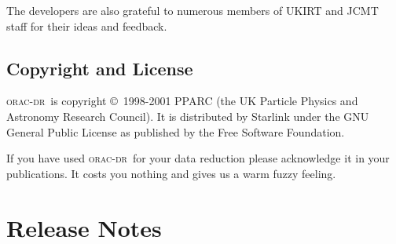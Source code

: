 \documentclass[twoside,11pt]{article}
\renewcommand{\_}{\texttt{\symbol{95}}}
\newcommand{\oracdr}{\textsc{orac-dr}}
\begin{document}
The developers are also grateful to numerous members of
UKIRT and JCMT staff for their ideas and feedback.

\subsection*{Copyright and License\label{ORAC-DR_Copyright_and_License}}

\oracdr\ is copyright \copyright\ 1998-2001 PPARC (the UK Particle Physics and Astronomy
Research Council). It is distributed by Starlink under the
GNU General Public License as published by the Free Software Foundation.



If you have used \oracdr\ for your data reduction please acknowledge it
in your publications. It costs you nothing and gives us a warm fuzzy
feeling.

\section{Release Notes}
\end{document}
